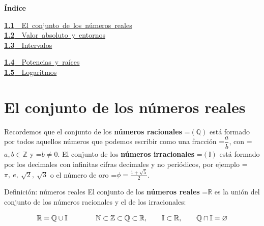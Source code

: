 \documentclass[11pt,a4paper]{article}
\newcommand{\fmm}[1]{\setbox0=\hbox{$#1$}\ifdim\wd0>\linewidth\fmdisp{#1}\else\mbox{\box0}\fi}
\newcommand{\fmdisp}[1]{\[\setbox2=\hbox{$\displaystyle #1$}\ifdim\wd2>\linewidth\resizebox{\linewidth}{!}{\box2}\else\box2\fi\]}
\begin{document}
\begin{tcolorbox}[colback=fmsurface,colframe=fmsurface,arc=3mm,left=4mm,right=4mm,top=2mm,bottom=2mm]
\small\textbf{Índice}\par\smallskip
\begin{minipage}[t]{0.49\linewidth}\small \mbox{\hyperlink{sec1}{\textbf{\color{fmgreen}1.1}\ \ El conjunto de los números reales}}\\[3pt]
\mbox{\hyperlink{sec2}{\textbf{\color{fmgreen}1.2}\ \ Valor absoluto y entornos}}\\[3pt]
\mbox{\hyperlink{sec3}{\textbf{\color{fmgreen}1.3}\ \ Intervalos}}\\[3pt]\end{minipage}\hfill\begin{minipage}[t]{0.49\linewidth}\small \mbox{\hyperlink{sec4}{\textbf{\color{fmgreen}1.4}\ \ Potencias y raíces}}\\[3pt]
\mbox{\hyperlink{sec5}{\textbf{\color{fmgreen}1.5}\ \ Logaritmos}}\\[3pt]\end{minipage}
\end{tcolorbox}

\section{El conjunto de los números reales}\hypertarget{sec1}{}

Recordemos que el conjunto de los \textbf{números racionales} \fmm{(\mathbb Q)} está formado por todos aquellos números que podemos escribir como una fracción \fmm{\dfrac ab}, con \fmm{a,b\in\mathbb Z} y \fmm{b\neq0}. El conjunto de los \textbf{números irracionales} \fmm{(\mathbb I)} está formado por los decimales con infinitas cifras decimales y no periódicos, por ejemplo \fmm{\pi,\ e,\ \sqrt2,\ \sqrt3} o el número de oro \fmm{\phi=\frac{1+\sqrt5}{2}}.

\begin{fmdef}{Definición: números reales}
El conjunto de los \textbf{números reales} \fmm{\mathbb R} es la unión del conjunto de los números racionales y el de los irracionales:

\fmdisp{\mathbb R=\mathbb Q\cup\mathbb I\qquad\qquad \mathbb N\subset\mathbb Z\subset\mathbb Q\subset\mathbb R,\qquad \mathbb I\subset\mathbb R,\qquad \mathbb Q\cap\mathbb I=\varnothing}

\end{fmdef}
\end{document}
